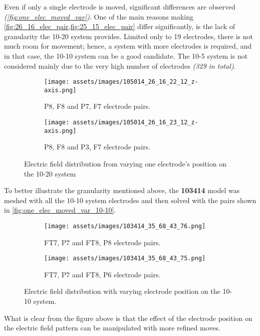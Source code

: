 Even if only a single electrode is moved, significant differences are observed \textit{(\autoref{fig:one_elec_moved_var})}. One of the main reasons making \cref{fig:26_16_elec_pair,fig:25_15_elec_pair} differ significantly, is the lack of granularity the 10-20 system provides. Limited only to 19 electrodes, there is not much room for movement; hence, a system with more electrodes is required, and in that case, the 10-10 system can be a good candidate. The 10-5 system is not considered mainly due to the very high number of electrodes \textit{(329 in total)}.
\begin{figure}[H]
    \centering
    \begin{subfigure}[b]{0.49\textwidth}
        \texttt{[image: assets/images/105014\_26\_16\_22\_12\_z-axis.png]}
        \caption{P8, F8 and P7, F7 electrode pairs.}
        \label{fig:26_16_12_22_elec_pair}
    \end{subfigure}
    \begin{subfigure}[b]{0.49\textwidth}
        \texttt{[image: assets/images/105014\_26\_16\_23\_12\_z-axis.png]}
        \caption{P8, F8 and P3, F7 electrode pairs.}
        \label{fig:25_15_13_24_elec_pair}
    \end{subfigure}
    \caption{Electric field distribution from varying one electrode's position on the 10-20 system}
    \label{fig:one_elec_moved_var}
\end{figure}

To better illustrate the granularity mentioned above, the \textbf{103414} model was meshed with all the 10-10 system electrodes and then solved with the pairs shown in \autoref{fig:one_elec_moved_var_10-10}.

\begin{figure}[H]
    \centering
    \begin{subfigure}[b]{0.49\textwidth}
        \texttt{[image: assets/images/103414\_35\_68\_43\_76.png]}
        \caption{FT7, P7 and FT8, P8 electrode pairs.}
        \label{fig:35_68_43_76_elec_pair}
    \end{subfigure}
    \begin{subfigure}[b]{0.49\textwidth}
        \texttt{[image: assets/images/103414\_35\_68\_43\_75.png]}
        \caption{FT7, P7 and FT8, P6 electrode pairs.}
        \label{fig:35_68_43_75_elec_pair}
    \end{subfigure}
    \caption{Electric field distribution with varying electrode position on the 10-10 system.}
    \label{fig:one_elec_moved_var_10-10}
\end{figure}

What is clear from the figure above is that the effect of the electrode position on the electric field pattern can be manipulated with more refined moves.
